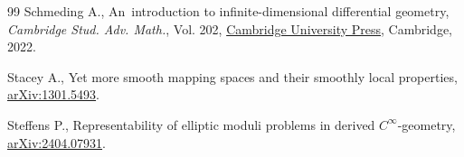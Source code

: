 \documentclass[pdftex]{sigma}
\numberwithin{equation}{section}
\begin{document}
\begin{thebibliography}{99}
Schmeding A., An~introduction to infinite-dimensional differential geometry,
 \textit{Cambridge Stud. Adv. Math.}, Vol. 202,
 \href{https://doi.org/10.1017/9781009091251}{Cambridge University Press},
 Cambridge, 2022.

Stacey A., Yet more smooth mapping spaces and their smoothly local properties,
 \href{http://arxiv.org/abs/1301.5493}{arXiv:1301.5493}.

Steffens P., Representability of elliptic moduli problems in derived
 {$C^{\infty}$}-geometry,
 \href{http://arxiv.org/abs/2404.07931}{arXiv:2404.07931}.

\end{thebibliography}\LastPageEnding
\end{document}
